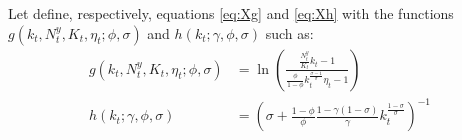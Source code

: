 Let define, respectively, equations \eqref{eq:Xg} and \eqref{eq:Xh} with the functions $g(k_t, N_t^y, K_t, \eta_t; \phi, \sigma)$ and $h(k_t ; \gamma, \phi, \sigma)$ such as:
\begin{align*}
	g(k_t, N_t^y, K_t, \eta_t; \phi, \sigma) &= \ln\left( \frac{ \frac{N_t^y}{K_t} k_t - 1 } { \frac{\phi}{1-\phi} k_t^{\frac{\sigma-1}{\sigma}} \eta_t - 1 }\right) \\
	h(k_t ; \gamma, \phi, \sigma) &= \left( \sigma + \frac{1-\phi}{\phi} \frac{1-\gamma(1-\sigma)}{\gamma} k_t^{\frac{1-\sigma}{\sigma}} \right)^{-1}
\end{align*}



